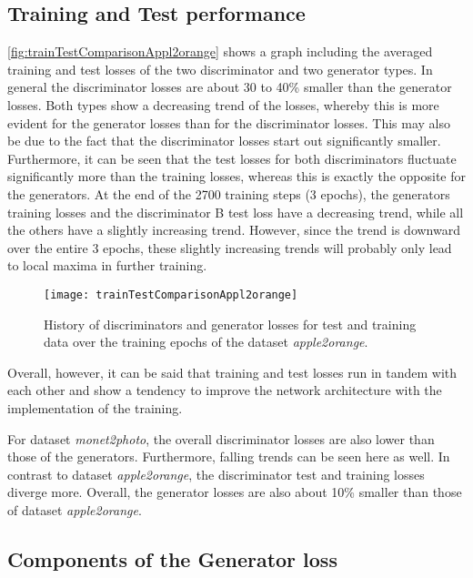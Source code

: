 \documentclass[fleqn,10pt]{SelfArx} %
\begin{document}
\subsection{Training and Test performance}
\autoref{fig:trainTestComparisonAppl2orange} shows a graph including the averaged training and test losses of the two discriminator and two generator types. In general the discriminator losses are about 30 to 40\% smaller than the generator losses. Both types show a decreasing trend of the losses, whereby this is more evident for the generator losses than for the discriminator losses. This may also be due to the fact that the discriminator losses start out significantly smaller. Furthermore, it can be seen that the test losses for both discriminators fluctuate significantly more than the training losses, whereas this is exactly the opposite for the generators. At the end of the 2700 training steps (3 epochs), the generators training losses and the discriminator B test loss have a decreasing trend, while all the others have a slightly increasing trend. However, since the trend is downward over the entire 3 epochs, these slightly increasing trends will probably only lead to local maxima in further training.

\begin{figure}[htb] 
	\centering 
	\texttt{[image: trainTestComparisonAppl2orange]}
	\caption{History of discriminators and generator losses for test and training data over the training epochs of the dataset \textit{apple2orange}.}
	\label{fig:trainTestComparisonAppl2orange}
\end{figure}

Overall, however, it can be said that training and test losses run in tandem with each other and show a tendency to improve the network architecture with the implementation of the training.

For dataset \textit{monet2photo}, the overall discriminator losses are also lower than those of the generators. Furthermore, falling trends can be seen here as well. In contrast to dataset \textit{apple2orange}, the discriminator test and training losses diverge more. Overall, the generator losses are also about 10\% smaller than those of dataset \textit{apple2orange}.

\subsection{Components of the Generator loss}
\end{document}

